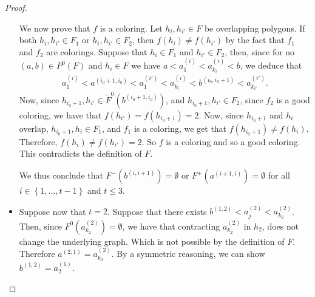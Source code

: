 \documentclass[12pt]{article}
\theoremstyle{definition}
\begin{document}
\begin{proof}
\begin{itemize}
             We now prove that $f$ is a coloring.
             Let $h_{i}, h_{i'} \in F$ be overlapping
             polygons. If both $h_{i}, h_{i'} \in F_1$ 
             or $h_{i}, h_{i'} \in F_2$, then 
             $f\left(h_{i}\right) \neq f\left(h_{i'}\right)$
             by the fact that $f_1$ and $f_2$ 
             are colorings.
             Suppose that $h_{i} \in F_1$ and
             $h_{i'} \in F_2$, then, since for no
             $\left(a, b\right) \in P^{0}\left(F\right)$ 
             and $h_{i} \in F$ we have
             $a < a_{1}^{\left(i\right)} <
             a_{k_{i}}^{\left(i\right)} < b$, we deduce that
             \begin{gather*}
                 a_1^{\left(i\right)} < 
                 a^{\left(i_0+1, i_0\right)} <
                 a_1^{\left(i'\right)} < 
                 a_{k_{i}}^{\left(i\right)} < 
                 b^{\left(i_0, i_0+1\right)} < 
                 a_{k_{i'}}^{\left(i'\right)}.
             \end{gather*}
             Now, since $h_{i_0+1}, h_{i'} \in 
             \widetilde{F}^{0}\left(b^{\left(i_0+1, i_0\right)}\right)$,
             and $h_{i_0+1}, h_{i'} \in F_2$,
             since $f_2$ is a good
             coloring, we have that $f\left(h_{i'}\right) =
             f\left(h_{i_0+1}\right) = 2$.
             Now, since $h_{i_0+1}$ and $h_{i}$ 
             overlap, 
             $h_{i_0+1}, h_{i} \in F_1$,
             and $f_1$ is a coloring, we get
             that $f\left(h_{i_0+1}\right) \neq
             f\left(h_{i}\right)$.
             Therefore, $f\left(h_{i}\right) \neq 
             f\left(h_{i'}\right) = 2$.
             So $f$ is a coloring and so
             a good coloring.
             This contradicts the definition
             of $F$.

             We thus conclude that
             $F^{-}\left(b^{\left(i, i+1\right)}\right) = \emptyset$ 
             or $F^{+}\left(a^{\left(i+1, i\right)}\right) = \emptyset$
             for all
             $i \in \left\{1, \ldots, t-1\right\}$ and
             $t \leq 3$.

             \item Suppose now that $t = 2$.
             Suppose that there exists
             $b^{\left(1,2\right)} < 
             a_{j}^{\left(2\right)} <
             a_{k_2}^{\left(2\right)}$.
             Then, since $F^{0}\left(a_{k_2}^{\left(2\right)}\right) = 
             \emptyset$, we have that 
             contracting $a_{k_2}^{\left(2\right)}$
             in $h_2$, does not change the underlying 
             graph. Which is not possible by
             the definition of $F$.
             Therefore $a^{\left(2,1\right)} =
             a_{k_2}^{\left(2\right)}$. By a
             symmetric reasoning, we can show
             $b^{\left(1, 2\right)} = a_2^{\left(1\right)}$.
             

\end{itemize}
\end{proof}
\end{document}
